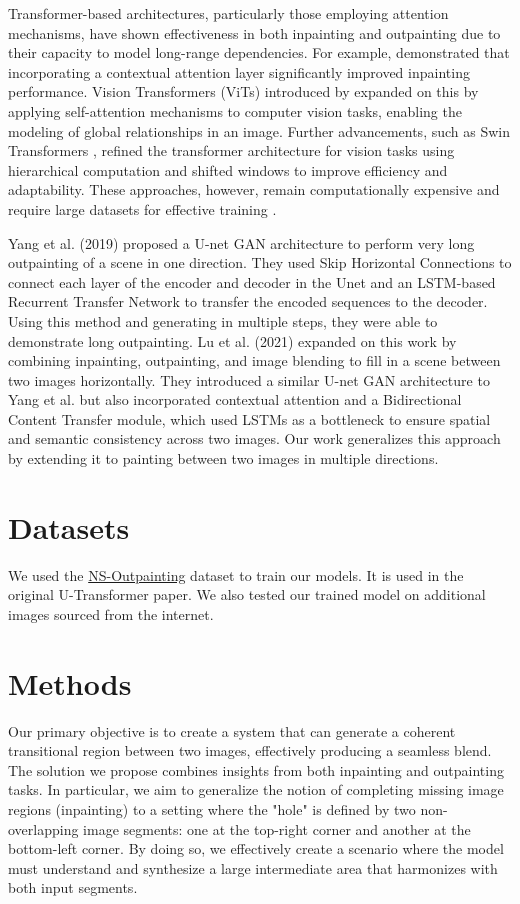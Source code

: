 \documentclass[sigconf]{acmart}
\begin{document}
Transformer-based architectures, particularly those employing attention mechanisms, have shown effectiveness in both inpainting and outpainting due to their capacity to model long-range dependencies. For example, \cite{Jiahui2018} demonstrated that incorporating a contextual attention layer significantly improved inpainting performance. Vision Transformers (ViTs) introduced by \cite{Dosovitskiy2020} expanded on this by applying self-attention mechanisms to computer vision tasks, enabling the modeling of global relationships in an image. Further advancements, such as Swin Transformers \cite{Liu2021}, refined the transformer architecture for vision tasks using hierarchical computation and shifted windows to improve efficiency and adaptability. These approaches, however, remain computationally expensive and require large datasets for effective training \cite{Dascoli2021}.

Yang et al. (2019) proposed a U-net GAN architecture to perform very long outpainting of a scene in one direction. They used Skip Horizontal Connections to connect each layer of the encoder and decoder in the Unet and an LSTM-based Recurrent Transfer Network to transfer the encoded sequences to the decoder. Using this method and generating in multiple steps, they were able to demonstrate long outpainting. Lu et al. (2021) expanded on this work by combining inpainting, outpainting, and image blending to fill in a scene between two images horizontally. They introduced a similar U-net GAN architecture to Yang et al. but also incorporated contextual attention and a Bidirectional Content Transfer module, which used LSTMs as a bottleneck to ensure spatial and semantic consistency across two images. Our work generalizes this approach by extending it to painting between two images in multiple directions.

\section*{Datasets}
We used the \textcolor{red}{\href{https://github.com/z-x-yang/NS-Outpainting}{NS-Outpainting}} dataset to train our models. It is used in the original U-Transformer paper. We also tested our trained model on additional images sourced from the internet.

\section*{Methods}

Our primary objective is to create a system that can generate a coherent transitional region between two images, effectively producing a seamless blend. The solution we propose combines insights from both inpainting and outpainting tasks. In particular, we aim to generalize the notion of completing missing image regions (inpainting) to a setting where the "hole" is defined by two non-overlapping image segments: one at the top-right corner and another at the bottom-left corner. By doing so, we effectively create a scenario where the model must understand and synthesize a large intermediate area that harmonizes with both input segments.
\end{document}
